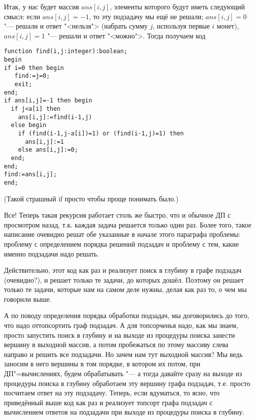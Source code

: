 Итак, у нас будет массив $ans[i,j]$, элементы которого будут иметь следующий смысл: если $ans[i,j]=-1$, то эту подзадачу мы ещё не решали; $ans[i,j]=0$ "--- решали и ответ "<нельзя"> (набрать сумму $j$, используя первые $i$ монет), $ans[i,j]=1$ "--- решали и ответ "<можно">. Тогда получаем код

\begin{codesampleo}\begin{verbatim}
function find(i,j:integer):boolean;
begin
if i=0 then begin
   find:=j=0;
   exit;
end;
if ans[i,j]=-1 then begin
  if j<a[i] then
    ans[i,j]:=find(i-1,j)
  else begin
    if (find(i-1,j-a[i])=1) or (find(i-1,j)=1) then
      ans[i,j]:=1
    else ans[i,j]:=0;
  end;
end;
find:=ans[i,j];
end;
\end{verbatim}\end{codesampleo}
(Такой страшный if просто чтобы проще понимать было.)

Все! Теперь такая рекурсия работает столь же быстро, что и обычное ДП с просмотром назад, т.к. каждая задача решается только один раз. Более того, такое написание очевидно решат обе указанные в начале этого параграфа проблемы: проблему с определением порядка решений подзадач и проблему с тем, какие именно подзадачи надо решать.

Действительно, этот код как раз и реализует поиск в глубину в графе подзадач (очевидно?), и решает только те задачи, до которых дошёл. Поэтому он решает только те задачи, которые нам на самом деле нужны, делая как раз то, о чем мы говорили выше.

А по поводу определения порядка обработки подзадач, мы договорились до того, что надо оттопсортить граф подзадач. А для топсорченья надо, как мы знаем, просто запустить поиск в глубину и на выходе из процедуры поиска занести вершину в выходной массив, а потом пробежаться по этому массиву слева направо и решить все подзадачи. Но зачем нам тут выходной массив? Мы ведь заносим в него вершины в том порядке, в котором их потом, при ДП"=вычислениях, будем обрабатывать "--- а тогда давайте сразу на выходе из процедуры поиска в глубину обработаем эту вершину графа подзадач, т.е. просто посчитаем ответ на эту подзадачу. Теперь, если вдуматься, то ясно, что приведённый выше код как раз и реализует топсорт графа подзадач с вычислением ответов на подзадачи при выходе из процедуры поиска в глубину.

